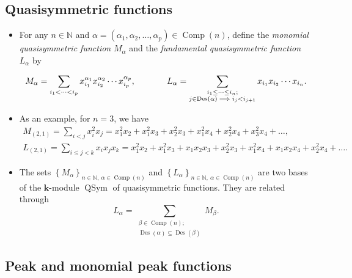 \documentclass[numbers=enddot,12pt,final,onecolumn,notitlepage]{scrartcl}%
\newcommand{\al}{\alpha}
\newcommand{\NN}{\mathbb{N}} %
\newcommand{\kk}{\mathbf{k}} %
\newcommand{\QSym}{\operatorname{QSym}}
\newcommand{\Des}{\operatorname{Des}}
\newcommand{\Comp}{\operatorname{Comp}}
\newcommand{\defn}[1]{{\color{darkred}\emph{#1}}}
\newcommand{\0}{\phantom{c}}
\let\sumnonlimits\sum
\renewcommand{\sum}{\sumnonlimits\limits}
\begin{document}
\subsection{Quasisymmetric functions}


\begin{itemize}
\item For any $n \in \NN$ and $\al =(\al_1,\al_2,\dots,\al_p) \in \Comp(n)$, define the \defn{monomial quasisymmetric function} $M_\al$ and the \defn{fundamental quasisymmetric function} $L_\al$ by

\begin{equation*}
\label{eq : M+L}
M_{\al} = \sum\limits_{i_1 < \cdots < i_p} x_{i_1}^{\al_1}x_{i_2}^{\al_2} \cdots x_{i_p}^{\al_p},\;\;\;\;\;\;\qquad L_{\al} = \sum\limits_{\substack{i_1 \leq \cdots \leq i_n;\\j\in \Des(\al) \implies i_j<i_{j+1}}} x_{i_1}x_{i_2} \cdots x_{i_n}.
\end{equation*}

\item As an example, for $n=3$, we have
\begin{gather*}
M_{(2,1)}=\sum_{i<j}x_{i}^{2}x_{j}=x_{1}^{2}x_{2}+x_{1}%
^{2}x_{3}+x_{2}^{2}x_{3}+x_{1}^{2}x_{4}+x_{2}^{2}x_{4}+x_{3}^{2}x_{4}+\dots,\\
L_{(2,1)}=\sum_{i\leq j <k}x_{i}x_{j}x_k=x_{1}^{2}x_{2}+x_{1}%
^{2}x_{3}+x_{1}x_{2}x_3+x_{2}^{2}x_{3}+x_{1}^{2}x_{4}+x_{1}
x_{2}x_{4}+x_{2}^{2}x_{4}+\dots.
\end{gather*}
\item The sets $\left\{M_\al\right\}_{n\in \NN,\ \al\in \Comp(n)}$
and $\left\{L_\al\right\}_{n\in \NN,\ \al\in \Comp(n)}$
are two bases of the $\kk$-module $\QSym$ of quasisymmetric functions.
They are related through
\begin{equation}
\label{eq : LM} L_{\al} = \sum_{{\substack{\beta \in \Comp(n);\\\Des(\alpha) \subseteq \Des(\beta)}}} M_{\beta}.
\end{equation}
\end{itemize}

\subsection{Peak and monomial peak functions}
\end{document}
